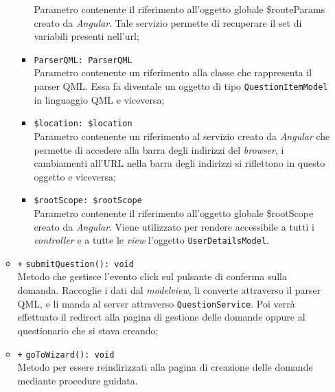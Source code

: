 \begin{itemize}
\begin{itemize}
\begin{itemize}
			Parametro contenente il riferimento all'oggetto globale \$routeParams creato da \textit{Angular}. Tale servizio permette di recuperare il set di variabili presenti nell'url; 
			\item \texttt{ParserQML: ParserQML} \\
			Parametro contenente un riferimento alla classe che rappresenta il parser QML. Essa fa diventale un oggetto di tipo \texttt{QuestionItemModel} in linguaggio QML e viceversa;
			\item \texttt{\$location: \$location} \\
			Parametro contenente un riferimento al servizio creato da \textit{Angular} che permette di accedere alla barra degli indirizzi del \textit{browser}, i cambiamenti all'URL nella barra degli indirizzi si riflettono in questo oggetto e viceversa; 
			\item \texttt{\$rootScope: \$rootScope} \\
			Parametro contenente il riferimento all'oggetto globale \$rootScope creato da \textit{Angular}. Viene utilizzato per rendere accessibile a tutti i \textit{controller} e a tutte le \textit{view} l'oggetto \texttt{UserDetailsModel}.
		\end{itemize}
		\item \texttt{+} \texttt{submitQuestion(): void}\\ 
		Metodo che gestisce l'evento click sul pulsante di conferma sulla domanda. Raccoglie i dati dal \textit{modelview}, li converte attraverso il parser QML, e li manda al server attraverso \texttt{QuestionService}. Poi verrà effettuato il redirect alla pagina di gestione delle domande oppure al questionario che si stava creando;
		\item \texttt{+} \texttt{goToWizard(): void}\\ 
		Metodo per essere reindirizzati alla pagina di creazione delle domande mediante procedure guidata.
	\end{itemize}
\end{itemize}


